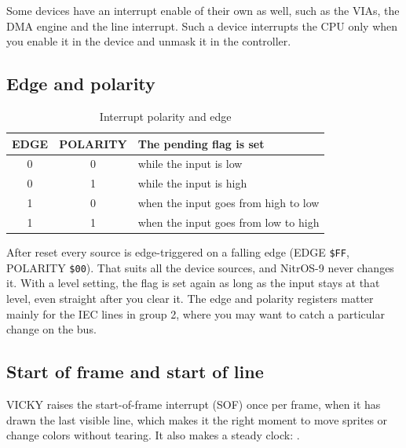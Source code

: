 


\begin{note}
    Some devices have an interrupt enable of their own as well, such as the VIAs, the DMA engine and the line interrupt. Such a device interrupts the CPU only when you enable it in the device and unmask it in the controller.
\end{note}

\subsection*{Edge and polarity}

\begin{table}[ht]
    \begin{center}
        \begin{tabular}{|c|c|l|} \hline
            EDGE & POLARITY & The pending flag is set \\ \hline\hline
            0 & 0 & while the input is low \\ \hline
            0 & 1 & while the input is high \\ \hline
            1 & 0 & when the input goes from high to low \\ \hline
            1 & 1 & when the input goes from low to high \\ \hline
        \end{tabular}
    \end{center}
    \caption{Interrupt polarity and edge}
    \label{tab:int_pol_edge}
\end{table}

After reset every source is edge-triggered on a falling edge (EDGE \verb+$FF+, POLARITY \verb+$00+). That suits all the device sources, and NitrOS-9 never changes it. With a level setting, the flag is set again as long as the input stays at that level, even straight after you clear it. The edge and polarity registers matter mainly for the IEC lines in group 2, where you may want to catch a particular change on the bus.

\subsection*{Start of frame and start of line}

VICKY raises the start-of-frame interrupt (SOF) once per frame, when it has drawn the last visible line, which makes it the right moment to move sprites or change colors without tearing. It also makes a steady clock: .

